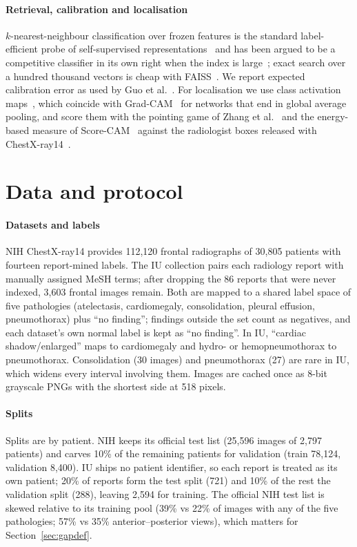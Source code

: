\documentclass[conference]{IEEEtran}
\begin{document}
\paragraph{Retrieval, calibration and localisation}
$k$-nearest-neighbour classification over frozen features is the standard label-efficient probe of self-supervised representations~\cite{caron2021} and has been argued to be a competitive classifier in its own right when the index is large~\cite{nakata2022}; exact search over a hundred thousand vectors is cheap with FAISS~\cite{johnson2019}. We report expected calibration error as used by Guo et al.~\cite{guo2017}. For localisation we use class activation maps~\cite{zhou2016}, which coincide with Grad-CAM~\cite{selvaraju2017} for networks that end in global average pooling, and score them with the pointing game of Zhang et al.~\cite{zhang2018pointing} and the energy-based measure of Score-CAM~\cite{wang2020scorecam} against the radiologist boxes released with ChestX-ray14~\cite{wang2017}.

\section{Data and protocol}
\label{sec:protocol}

\paragraph{Datasets and labels}
NIH ChestX-ray14 provides 112,120 frontal radiographs of 30,805 patients with fourteen report-mined labels. The IU collection pairs each radiology report with manually assigned MeSH terms; after dropping the 86 reports that were never indexed, 3,603 frontal images remain. Both are mapped to a shared label space of five pathologies (atelectasis, cardiomegaly, consolidation, pleural effusion, pneumothorax) plus ``no finding''; findings outside the set count as negatives, and each dataset's own normal label is kept as ``no finding''. In IU, ``cardiac shadow/enlarged'' maps to cardiomegaly and hydro- or hemopneumothorax to pneumothorax. Consolidation (30 images) and pneumothorax (27) are rare in IU, which widens every interval involving them. Images are cached once as 8-bit grayscale PNGs with the shortest side at 518 pixels.

\paragraph{Splits}
Splits are by patient. NIH keeps its official test list (25,596 images of 2,797 patients) and carves 10\% of the remaining patients for validation (train 78,124, validation 8,400). IU ships no patient identifier, so each report is treated as its own patient; 20\% of reports form the test split (721) and 10\% of the rest the validation split (288), leaving 2,594 for training. The official NIH test list is skewed relative to its training pool (39\% vs 22\% of images with any of the five pathologies; 57\% vs 35\% anterior--posterior views), which matters for Section~\ref{sec:gapdef}.
\end{document}
